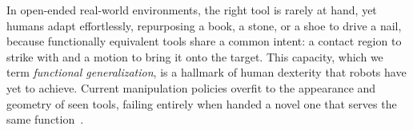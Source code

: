 
In open-ended real-world environments, the right tool is rarely at hand, yet humans adapt effortlessly, repurposing a book, a stone, or a shoe to drive a nail, because functionally equivalent tools share a common intent: a contact region to strike with and a motion to bring it onto the target. This capacity, which we term \textit{functional generalization}, is a hallmark of human dexterity that robots have yet to achieve. Current manipulation policies overfit to the appearance and geometry of seen tools, failing entirely when handed a novel one that serves the same function~\cite{chen2025tool, turpin2021gift, qin2023robot}.


